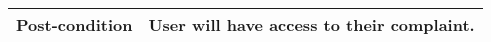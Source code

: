 \begin{table}[]
\begin{tabular}{|l|p{5cm}p{5cm}|}
        {\color[HTML]{231F20} \textbf{Post-condition}}                                                  & \multicolumn{2}{l|}{{\color[HTML]{231F20} User   will have access to their complaint.}}                                                                                                                                                                                                                                                     \\ \hline
    \end{tabular}
\end{table}